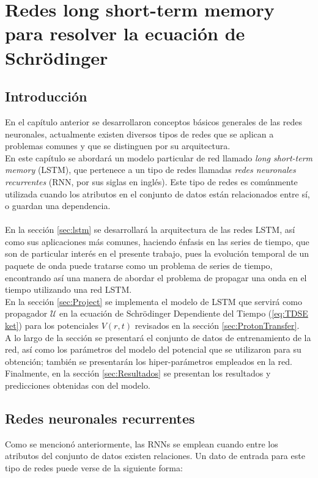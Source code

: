 \chapter{Redes long short-term memory para resolver la ecuación de Schrödinger}\label{ch:LSTMapplied}
\section{Introducción}
En el capítulo anterior se desarrollaron conceptos básicos generales de las redes neuronales, actualmente existen diversos tipos de redes que se aplican a problemas comunes y que se distinguen por su arquitectura.
\\
En este capítulo se abordará un modelo particular de red llamado \emph{long short-term memory} (\acs{LSTM}), que pertenece a un tipo de redes llamadas \emph{redes neuronales recurrentes} (\acs{RNN}, por sus siglas en inglés). Este tipo de redes es comúnmente utilizada cuando los atributos en el conjunto de datos están relacionados entre sí, o guardan una dependencia.
\\\\
En la sección \autoref{sec:lstm} se desarrollará la arquitectura de las redes \acs{LSTM}, así como sus aplicaciones más comunes, haciendo énfasis en las series de tiempo, que son de particular interés en el presente trabajo, pues la evolución temporal de un paquete de onda puede tratarse como un problema de series de tiempo, encontrando así una manera de abordar el problema de propagar una onda en el tiempo utilizando una red \acs{LSTM}.
\\
En la sección \autoref{sec:Project} se implementa el modelo de \acs{LSTM} que servirá como propagador $\mathcal{U}$ en la ecuación de Schrödinger Dependiente del Tiempo (\autoref{eq:TDSE ket}) para los potenciales $V(r,t)$ revisados en la sección \autoref{sec:ProtonTransfer}.
\\
A lo largo de la sección se presentará el conjunto de datos de entrenamiento de la red, así como los parámetros del modelo del potencial que se utilizaron para su obtención; también se presentarán los hiper-parámetros empleados en la red. Finalmente, en la sección \autoref{sec:Resultados} se presentan los resultados y predicciones obtenidas con del modelo.

\section{Redes neuronales recurrentes}\label{sec:RNN}
Como se mencionó anteriormente, las \acs{RNN}s \cite{McCulloch1943, Rumelhart1986} se emplean cuando entre los atributos del conjunto de datos existen relaciones. Un dato de entrada para este tipo de redes puede verse de la siguiente forma:

